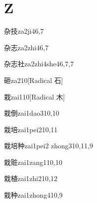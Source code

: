 
\section*{Z}

\begin{entry}{杂技}{za2ji4}{6,7}
\end{entry}

\begin{entry}{杂志}{za2zhi4}{6,7}
\end{entry}

\begin{entry}{杂志社}{za2zhi4she4}{6,7,7}
\end{entry}

\begin{entry}{砸}{za2}{10}[Radical 石]
\end{entry}

\begin{entry}{栽}{zai1}{10}[Radical 木]
\end{entry}

\begin{entry}{栽倒}{zai1dao3}{10,10}
\end{entry}

\begin{entry}{栽培}{zai1pei2}{10,11}
\end{entry}

\begin{entry}{栽培种}{zai1pei2 zhong3}{10,11,9}
\end{entry}

\begin{entry}{栽赃}{zai1zang1}{10,10}
\end{entry}

\begin{entry}{栽植}{zai1zhi2}{10,12}
\end{entry}

\begin{entry}{栽种}{zai1zhong4}{10,9}
\end{entry}

